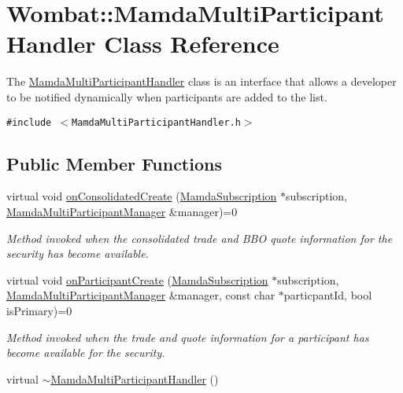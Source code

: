 \hypertarget{classWombat_1_1MamdaMultiParticipantHandler}{
\section{Wombat::Mamda\-Multi\-Participant\-Handler Class Reference}
\label{classWombat_1_1MamdaMultiParticipantHandler}
}
The \hyperlink{classWombat_1_1MamdaMultiParticipantHandler}{Mamda\-Multi\-Participant\-Handler} class is an interface that allows a developer to be notified dynamically when participants are added to the list.  


{\tt \#include $<$Mamda\-Multi\-Participant\-Handler.h$>$}

\subsection*{Public Member Functions}
\begin{CompactItemize}
\item 
virtual void \hyperlink{classWombat_1_1MamdaMultiParticipantHandler_6882729b5fea8d62996e3c1de7f1d2f7}{on\-Consolidated\-Create} (\hyperlink{classWombat_1_1MamdaSubscription}{Mamda\-Subscription} $\ast$subscription, \hyperlink{classWombat_1_1MamdaMultiParticipantManager}{Mamda\-Multi\-Participant\-Manager} \&manager)=0
\begin{CompactList}\small\item\em Method invoked when the consolidated trade and BBO quote information for the security has become available. \item\end{CompactList}\item 
virtual void \hyperlink{classWombat_1_1MamdaMultiParticipantHandler_da40bbe1aa0fe168feb193aa8f2e8cfd}{on\-Participant\-Create} (\hyperlink{classWombat_1_1MamdaSubscription}{Mamda\-Subscription} $\ast$subscription, \hyperlink{classWombat_1_1MamdaMultiParticipantManager}{Mamda\-Multi\-Participant\-Manager} \&manager, const char $\ast$particpant\-Id, bool is\-Primary)=0
\begin{CompactList}\small\item\em Method invoked when the trade and quote information for a participant has become available for the security. \item\end{CompactList}\item 
virtual \hyperlink{classWombat_1_1MamdaMultiParticipantHandler_1befa1fe7f6b06f14aa20c9fddecbe41}{$\sim$Mamda\-Multi\-Participant\-Handler} ()
\end{CompactItemize}


